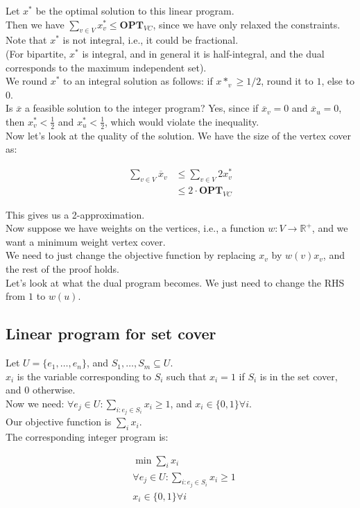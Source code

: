 \documentclass[a4paper]{article}
\newcommand{\nl}{\vspace{0.2cm}\\}
\newcommand{\ol}{\overline}
\newcommand{\R}{\mathbb{R}}
\newcommand{\OPT}{\mathbf{OPT}}
\begin{document}
Let $x^*$ be the optimal solution to this linear program.\nl
Then we have $\sum_{v \in V} {x^*_v} \le \OPT_{VC}$, since we have only relaxed the constraints.
Note that $x^*$ is not integral, i.e., it could be fractional.\nl
(For bipartite, $x^*$ is integral, and in general it is half-integral, and the dual corresponds to the maximum independent set).\nl
We round $x^*$ to an integral solution as follows: if $x*_v \ge 1/2$, round it to $1$, else to $0$.\nl

Is $\ol{x}$ a feasible solution to the integer program? Yes, since if $\ol{x}_v = 0$ and $\ol{x}_u = 0$, then $x^*_v < \frac{1}{2}$ and $x^*_u < \frac{1}{2}$, which would violate the
inequality.\nl

Now let's look at the quality of the solution. We have the size of the vertex cover as:

\begin{align*}
    \sum_{v \in V} \ol{x}_v &\le \sum_{v \in V} 2 x^*_v\\
                            &\le 2\cdot \OPT_{VC}
\end{align*}

This gives us a 2-approximation.\nl

Now suppose we have weights on the vertices, i.e., a function $w : V \to \R^+$, and we want a minimum weight vertex cover.\nl
We need to just change the objective function by replacing $x_v$ by $w(v) x_v$, and the rest of the proof holds.\nl

Let's look at what the dual program becomes.
We just need to change the RHS from $1$ to $w(u)$.

\subsection{Linear program for set cover}

Let $U = \{e_1, \ldots, e_n\}$, and $S_1, \ldots, S_m \subseteq U$.\nl
$x_i$ is the variable corresponding to $S_i$ such that $x_i = 1$ if $S_i$ is in the set cover, and 0 otherwise.\nl
Now we need: $\forall e_j \in U: \sum_{i: e_j \in S_i} x_i \ge 1$, and $x_i \in \{0, 1\} \forall i$.\nl
Our objective function is $\sum_{i} x_i$.\nl

The corresponding integer program is:

\begin{align*}
    &\min \sum_{i} x_i\\
    &\forall e_j \in U: \sum_{i : e_j \in S_i} x_i \ge 1\\
    &x_i \in \{0, 1\} \forall i
\end{align*}
\end{document}
